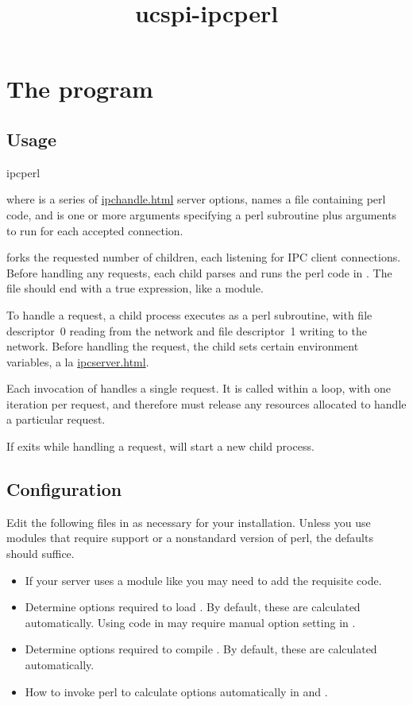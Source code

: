 \documentclass{book}
\title{ucspi-ipcperl}
\begin{document}
\section{The  program}

\subsection{Usage}
\begin{code}%
  ipcperl   
\end{code}
where  is a series of \href{ipchandle}{ipchandle.html} server
options,  names a file containing perl code, and 
is one or more arguments specifying a perl subroutine plus arguments to
run for each accepted connection.

 forks the requested number of children, each listening for
IPC client connections.  Before handling any requests, each child parses
and runs the perl code in .  The file should end with a true
expression, like a module.

To handle a request, a child process executes  as a perl
subroutine, with file descriptor~0 reading from the network and file
descriptor~1 writing to the network.  Before handling the request, the
child sets certain environment variables, a la
\href{\cmd{ipcserver}}{ipcserver.html}.

Each invocation of  handles a single request.  It is called
within a loop, with one iteration per request, and therefore must
release any resources allocated to handle a particular request.

If  exits while handling a request,  will
start a new child process.


\subsection{Configuration}
Edit the following files in  as necessary for your
installation.  Unless you use modules that require  support or a
nonstandard version of perl, the defaults should suffice.
\begin{itemize}
\item{}
  If your server uses a module like  you may need to add the
  requisite  code.

\item{}
  Determine options required to load .  By default,
  these are calculated automatically.  Using  code in
   may require manual option setting in
  .

\item{}
  Determine options required to compile .  By default,
  these are calculated automatically.

\item{}
  How to invoke perl to calculate options automatically in
   and .
\end{itemize}
\end{document}
